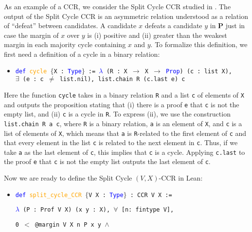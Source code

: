 \documentclass[runningheads]{llncs}
\begin{document}
\begin{example}\label{SplitCycleEx1} As an example of a CCR, we consider the Split Cycle CCR studied in \cite{HP2020}. The output of the Split Cycle CCR is an asymmetric relation understood as a relation of ``defeat'' between candidates. A candidate $x$ defeats a candidate $y$ in $\mathbf{P}$ just in case the margin of $x$ over $y$ is (i) positive and (ii) greater than the weakest margin in each majority cycle containing $x$ and $y$. To formalize this definition, we first need a definition of a cycle in a binary relation:
\begin{itemize}
\item[] \texttt{\textcolor{blue}{def} \textcolor{orange}{cycle} $\{$X : \textcolor{blue}{Type}$\}$ := \textcolor{blue}{$\lambda$} (R : X $\to$ X $\to$ \textcolor{blue}{Prop}) (c : list X), \\
$\exists$ (e : c $\neq$ list.nil), list.chain R (c.last e) c}
\end{itemize}
Here the function \texttt{cycle} takes in a binary relation \texttt{R} and a list \texttt{c} of elements of \texttt{X} and outputs the proposition stating that (i) there is a proof \texttt{e} that \texttt{c} is not the empty list, and (ii) \texttt{c} is a cycle in \texttt{R}. To express (ii), we use the construction \texttt{list.chain R a c}, where \texttt{R} is a binary relation, \texttt{a} is an element of \texttt{X}, and \texttt{c} is a list of elements of \texttt{X}, which means that \texttt{a} is \texttt{R}-related to the first element of \texttt{c} and that every element in the list \texttt{c} is related to the next element in \texttt{c}. Thus, if we take \texttt{a} as the last element of \texttt{c}, this implies that \texttt{c} is a cycle. Applying \texttt{c.last} to the proof \texttt{e} that \texttt{c} is not the empty list outputs the last element of \texttt{c}.

Now we are ready to define the Split Cycle $(V,X)$-CCR in Lean:
\begin{itemize}
\item[] \texttt{\textcolor{blue}{def} \textcolor{orange}{split\_cycle\_CCR} $\{$V X : \textcolor{blue}{Type}$\}$ : CCR V X :=} 

    \texttt{\textcolor{blue}{$\lambda$} (P : Prof V X) (x y : X), $\forall$ [n: fintype V],}
    
    \texttt{0 $<$ @margin V X n P x y $\wedge$}
    

\end{itemize}
\end{example}
\end{document}
